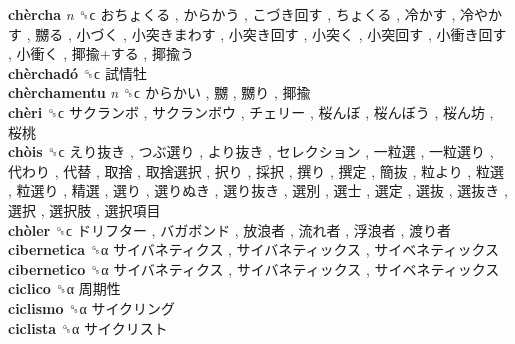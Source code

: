 \textbf{chèrcha} \emph{n}  ␝ϲ   おちょくる ,  からかう ,  こづき回す ,  ちょくる ,  冷かす ,  冷やかす ,  嬲る ,  小づく ,  小突きまわす ,  小突き回す ,  小突く ,  小突回す ,  小衝き回す ,  小衝く ,  揶揄+する ,  揶揄う   \\
\textbf{chèrchadó} ␝ϲ   試情牡   \\
\textbf{chèrchamentu} \emph{n}  ␝ϲ   からかい ,  嬲 ,  嬲り ,  揶揄   \\
\textbf{chèri} ␝ϲ   サクランボ ,  サクランボウ ,  チェリー ,  桜んぼ ,  桜んぼう ,  桜ん坊 ,  桜桃   \\
\textbf{chòis} ␝ϲ   えり抜き ,  つぶ選り ,  より抜き ,  セレクション ,  一粒選 ,  一粒選り ,  代わり ,  代替 ,  取捨 ,  取捨選択 ,  択り ,  採択 ,  撰り ,  撰定 ,  簡抜 ,  粒より ,  粒選 ,  粒選り ,  精選 ,  選り ,  選りぬき ,  選り抜き ,  選別 ,  選士 ,  選定 ,  選抜 ,  選抜き ,  選択 ,  選択肢 ,  選択項目   \\
\textbf{chòler} ␝ϲ   ドリフター ,  バガボンド ,  放浪者 ,  流れ者 ,  浮浪者 ,  渡り者   \\
\textbf{cibernetica} ␝α   サイバネティクス ,  サイバネティックス ,  サイベネティックス   \\
\textbf{cibernetico} ␝α   サイバネティクス ,  サイバネティックス ,  サイベネティックス   \\
\textbf{ciclico} ␝α   周期性   \\
\textbf{ciclismo} ␝α   サイクリング   \\
\textbf{ciclista} ␝α   サイクリスト   \\
